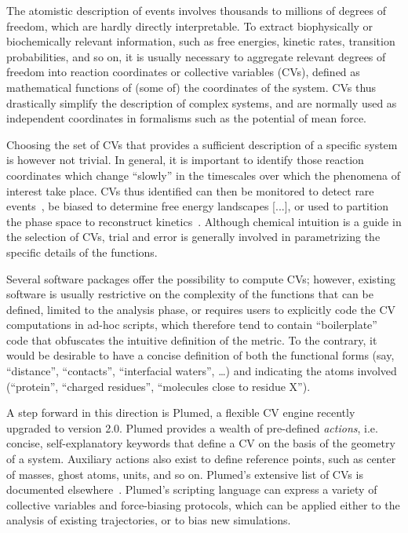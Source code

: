 \documentclass[preprint,12pt]{elsarticle}
\begin{document}
The atomistic description of events involves thousands to millions of
degrees of freedom, which are hardly directly interpretable. To
extract biophysically or biochemically relevant information, such
as free energies, kinetic rates, transition probabilities, and so on,
it is usually necessary to aggregate relevant degrees of freedom
into reaction coordinates or collective variables (CVs), defined
as mathematical functions of (some of) the coordinates of the system.
CVs thus drastically simplify the description of complex systems, and
are normally  used as independent coordinates in formalisms such as
the potential of mean force. 

Choosing the set of CVs that provides a sufficient description of a
specific system is however not trivial. In general, it is important to
identify those reaction coordinates which change ``slowly'' in the
timescales over which the phenomena of interest take place. CVs thus
identified can then be monitored to detect rare
events~\cite{Giorgino_Buch_2012}, be biased to determine free energy
landscapes [...], or used to partition the phase space to reconstruct
kinetics~\cite{Buch_Giorgino_2011,Biarnes_Pietrucci_Marinelli_Laio_2012}.
Although chemical intuition is a guide in the selection of CVs, trial
and error is generally involved in parametrizing the specific details
of the functions.

Several software packages offer the possibility to compute CVs;
however, existing software is usually restrictive on the complexity of
the functions that can be defined, limited to the analysis phase, or
requires users to explicitly code the CV computations in ad-hoc
scripts, which therefore tend to contain ``boilerplate'' code that
obfuscates the intuitive definition of the metric. To the contrary, it
would be desirable to have a concise definition of both the functional
forms (say, ``distance'', ``contacts'', ``interfacial waters'', \dots)
and indicating the atoms involved (``protein'', ``charged residues'', ``molecules
close to residue X'').

A step forward in this direction is Plumed, a flexible CV engine
recently upgraded to version 2.0. Plumed provides a wealth of
pre-defined \emph{actions}, i.e. concise, self-explanatory keywords that define a CV on
the basis of the geometry of a system. Auxiliary actions also exist to
define reference points, such as center of masses, ghost atoms, units,
and so on. Plumed's extensive list of CVs is documented
elsewhere~\cite{plumed_manual,bonomi_plumed:_2009}.  Plumed's
scripting language can express a variety of collective variables and
force-biasing protocols, which can be applied either to the analysis
of existing trajectories, or to bias new simulations.
\end{document}
